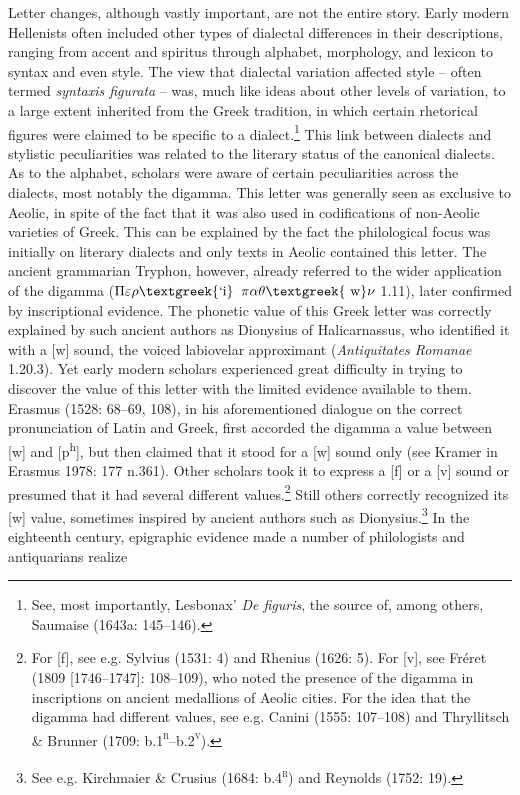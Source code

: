 \documentclass[12pt]{article}
\makeatletter
\renewcommand\subsection{\@startsection{subsection}{2}{0.1972in}{0.1665in}{0.0835in}{\normalfont\normalsize\fontsize{12pt}{14.4pt}\selectfont\rmfamily\bfseries}}
\newenvironment{styleCatalogusnotities}{\renewcommand\baselinestretch{1.25}\setlength\leftskip{0in}\setlength\rightskip{0in}\setlength\parindent{0in}\setlength\parfillskip{0pt plus 1fil}\setlength\parskip{0in plus 1pt}\writerlistparindent\writerlistleftskip\leavevmode\normalfont\normalsize\writerlistlabel\ignorespaces}{\unskip\vspace{0in plus 1pt}\par}
\newcommand\writerlistleftskip{}
\newcommand\writerlistparindent{}
\newcommand\writerlistlabel{}
\makeatother
\begin{document}
\subsection{Beyond letter changes}
\hypertarget{Toc19704846}{}\begin{styleCatalogusnotities}
Letter changes, although vastly important, are not the entire story. Early modern Hellenists often included other types of dialectal differences in their descriptions, ranging from accent and spiritus through alphabet, morphology, and lexicon to syntax and even style. The view that dialectal variation affected style – often termed \textit{syntaxis figurata} – was, much like ideas about other levels of variation, to a large extent inherited from the Greek tradition, in which certain rhetorical figures were claimed to be specific to a dialect.\footnote{\textrm{ See, most importantly, Lesbonax’ }\textrm{\textit{De figuris}}\textrm{, the source of, among others, Saumaise (1643a: 145–146).}} This link between dialects and stylistic peculiarities was related to the literary status of the canonical dialects. As to the alphabet, scholars were aware of certain peculiarities across the dialects, most notably the digamma. This letter was generally seen as exclusive to Aeolic, in spite of the fact that it was also used in codifications of non-Aeolic varieties of Greek. This can be explained by the fact the philological focus was initially on literary dialects and only texts in Aeolic contained this letter. The ancient grammarian Tryphon, however, already referred to the wider application of the digamma ($\Pi \varepsilon \rho \text{\textgreek{`i}}$ $\pi \alpha \theta \text{\textgreek{~w}}\nu $ 1.11), later confirmed by inscriptional evidence. The phonetic value of this Greek letter was correctly explained by such ancient authors as Dionysius of Halicarnassus, who identified it with a [w] sound, the voiced labiovelar approximant (\textit{Antiquitates Romanae} 1.20.3). Yet early modern scholars experienced great difficulty in trying to discover the value of this letter with the limited evidence available to them. Erasmus (1528: 68–69, 108), in his aforementioned dialogue on the correct pronunciation of Latin and Greek, first accorded the digamma a value between [w] and [p\textsuperscript{h}], but then claimed that it stood for a [w] sound only (see Kramer in Erasmus 1978: 177 n.361). Other scholars took it to express a [f] or a [v] sound or presumed that it had several different values.\footnote{\textrm{ For [f], see e.g. Sylvius (1531: 4) and Rhenius (1626: 5). For [v], see Fréret (1809 [1746–1747]: 108–109), who noted the presence of the digamma in inscriptions on ancient medallions of Aeolic cities. For the idea that the digamma had different values, see e.g. Canini (1555: 107–108) and Thryllitsch \& Brunner (1709: b.1}\textrm{\textsc{\textsuperscript{r}}}\textrm{–b.2}\textrm{\textsc{\textsuperscript{v}}}\textrm{).}} Still others correctly recognized its [w] value, sometimes inspired by ancient authors such as Dionysius.\footnote{\textrm{ See e.g. Kirchmaier \& Crusius (1684: b.4}\textrm{\textsc{\textsuperscript{r}}}\textrm{\textsc{) }}\textrm{and Reynolds (1752: 19).}} In the eighteenth century, epigraphic evidence made a number of philologists and antiquarians realize 
\end{styleCatalogusnotities}
\end{document}
